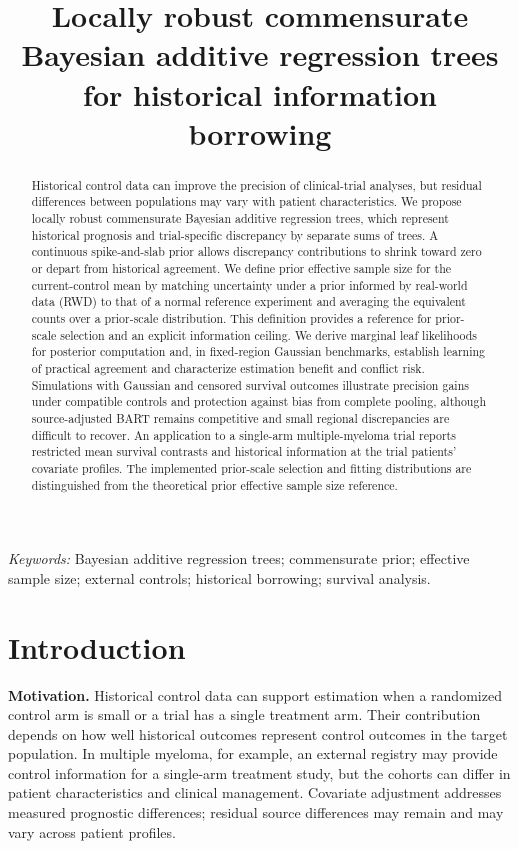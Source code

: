 \documentclass[11pt]{article}
\title{Locally robust commensurate Bayesian additive regression trees for historical information borrowing}
\author{}
\date{}
\begin{document}
\maketitle
\begin{abstract}
Historical control data can improve the precision of clinical-trial analyses, but residual differences between populations may vary with patient characteristics. We propose locally robust commensurate Bayesian additive regression trees, which represent historical prognosis and trial-specific discrepancy by separate sums of trees. A continuous spike-and-slab prior allows discrepancy contributions to shrink toward zero or depart from historical agreement. We define prior effective sample size for the current-control mean by matching uncertainty under a prior informed by real-world data (RWD) to that of a normal reference experiment and averaging the equivalent counts over a prior-scale distribution. This definition provides a reference for prior-scale selection and an explicit information ceiling. We derive marginal leaf likelihoods for posterior computation and, in fixed-region Gaussian benchmarks, establish learning of practical agreement and characterize estimation benefit and conflict risk. Simulations with Gaussian and censored survival outcomes illustrate precision gains under compatible controls and protection against bias from complete pooling, although source-adjusted BART remains competitive and small regional discrepancies are difficult to recover. An application to a single-arm multiple-myeloma trial reports restricted mean survival contrasts and historical information at the trial patients' covariate profiles. The implemented prior-scale selection and fitting distributions are distinguished from the theoretical prior effective sample size reference.
\end{abstract}
\noindent\textit{Keywords:} Bayesian additive regression trees; commensurate prior; effective sample size; external controls; historical borrowing; survival analysis.

\section{Introduction}
\noindent\textbf{Motivation.}
Historical control data can support estimation when a randomized control arm is small or a trial has a single treatment arm. Their contribution depends on how well historical outcomes represent control outcomes in the target population. In multiple myeloma, for example, an external registry may provide control information for a single-arm treatment study, but the cohorts can differ in patient characteristics and clinical management. Covariate adjustment addresses measured prognostic differences; residual source differences may remain and may vary across patient profiles.
\end{document}
